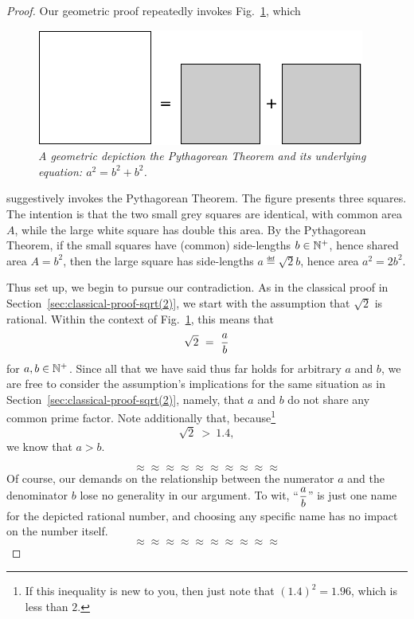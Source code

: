 \begin{proof}
Our geometric proof repeatedly invokes Fig.~\ref{fig:irrationality1}, which
\begin{figure}[htb]
\begin{center}
       \includegraphics[scale=0.4]{FiguresArithmetic/sqrt2initial}
\caption{{\it A geometric depiction the Pythagorean Theorem and its
    underlying equation: $a^2 = b^2 + b^2$.}
\label{fig:irrationality1}}
\end{center}
\end{figure}
suggestively invokes the Pythagorean Theorem.  The figure presents
three squares.  The intention is that the two small grey squares are
identical, with common area $A$, while the large white square has
double this area.  By the Pythagorean Theorem, if the small squares
have (common) side-lengths $b \in \mathbb{N}^+$, hence shared area $A = b^2$,
then the large square has side-lengths $a \eqdef \sqrt{2}b$, hence
area $a^2 = 2 b^2$.

Thus set up, we begin to pursue our contradiction.  As in the
classical proof in Section~\ref{sec:classical-proof-sqrt(2)}, we start
with the assumption that $\sqrt{2}$ is rational.  Within the context
of Fig.~\ref{fig:irrationality1}, this means that
\[ \sqrt{2} \ = \ {a \over b} \]
for $a, b \in \mathbb{N}^+$.  Since all that we have said thus far holds for
arbitrary $a$ and $b$, we are free to consider the assumption's
implications for the same situation as in
Section~\ref{sec:classical-proof-sqrt(2)}, namely, that $a$ and $b$ do
not share any common prime factor.  Note additionally that,
because\footnote{If this inequality is new to you, then just note that
  $(1.4)^2 = 1.96$, which is less than $2$.}
\[ \sqrt{2} \ > \ 1.4, \]
we know that $a > b$.

\[ \approx \approx \approx \approx \approx \approx \approx \approx \approx \approx \]
Of course, our demands on the relationship between the numerator $a$
and the denominator $b$ lose no generality in our argument.  To wit,
``$\displaystyle {a \over b}$'' is just one name for the depicted
rational number, and choosing any specific name has no impact on the
number itself.
\[ \approx \approx \approx \approx \approx \approx \approx \approx \approx \approx \]


\end{proof}

